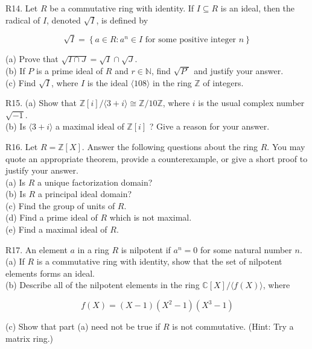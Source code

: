 R14. Let $R$ be a commutative ring with identity. If $I \subseteq R$ is an ideal, then the radical of $I$, denoted $\sqrt{I}$, is defined by

$$
\sqrt{I}=\left\{a \in R: a^{n} \in I \text { for some positive integer } n\right\}
$$

(a) Prove that $\sqrt{I \cap J}=\sqrt{I} \cap \sqrt{J}$.\\
(b) If $P$ is a prime ideal of $R$ and $r \in \mathbb{N}$, find $\sqrt{P^{r}}$ and justify your answer.\\
(c) Find $\sqrt{I}$, where $I$ is the ideal $\langle 108\rangle$ in the ring $\mathbb{Z}$ of integers.

R15. (a) Show that $\mathbb{Z}[i] /\langle 3+i\rangle \cong \mathbb{Z} / 10 \mathbb{Z}$, where $i$ is the usual complex number $\sqrt{-1}$.\\
(b) Is $\langle 3+i\rangle$ a maximal ideal of $\mathbb{Z}[i]$ ? Give a reason for your answer.

R16. Let $R=\mathbb{Z}[X]$. Answer the following questions about the ring $R$. You may quote an appropriate theorem, provide a counterexample, or give a short proof to justify your answer.\\
(a) Is $R$ a unique factorization domain?\\
(b) Is $R$ a principal ideal domain?\\
(c) Find the group of units of $R$.\\
(d) Find a prime ideal of $R$ which is not maximal.\\
(e) Find a maximal ideal of $R$.

R17. An element $a$ in a ring $R$ is nilpotent if $a^{n}=0$ for some natural number $n$.\\
(a) If $R$ is a commutative ring with identity, show that the set of nilpotent elements forms an ideal.\\
(b) Describe all of the nilpotent elements in the ring $\mathbb{C}[X] /\langle f(X)\rangle$, where

$$
f(X)=(X-1)\left(X^{2}-1\right)\left(X^{3}-1\right)
$$

(c) Show that part (a) need not be true if $R$ is not commutative. (Hint: Try a matrix ring.)


